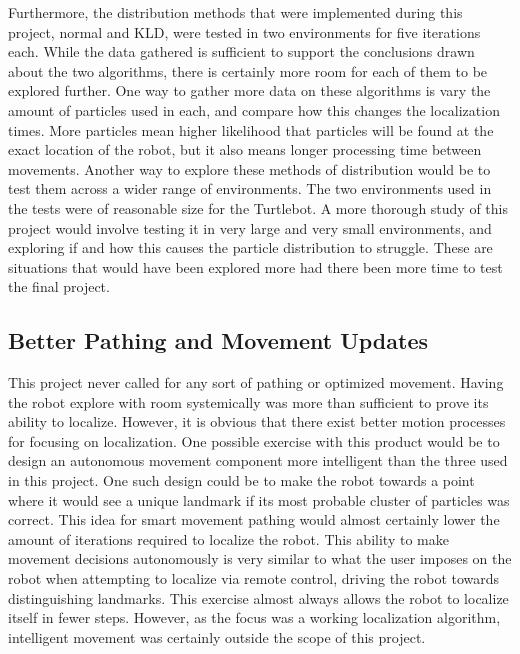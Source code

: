 \documentclass{article}
\newcommand\tab[1][0.5cm]{\hspace*{#1}}
\begin{document}
Furthermore, the distribution methods that were implemented during this project, normal and KLD, were tested in two environments for five iterations each. While the data gathered is sufficient to support the conclusions drawn about the two algorithms, there is certainly more room for each of them to be explored further. One way to gather more data on these algorithms is vary the amount of particles used in each, and compare how this changes the localization times. More particles mean higher likelihood that particles will be found at the exact location of the robot, but it also means longer processing time between movements. Another way to explore these methods of distribution would be to test them across a wider range of environments. The two environments used in the tests were of reasonable size for the Turtlebot. A more thorough study of this project would involve testing it in very large and very small environments, and exploring if and how this causes the particle distribution to struggle. These are situations that would have been explored more had there been more time to test the final project.\\

\subsection{Better Pathing and Movement Updates}\label{fig:fwpathing}
\tab This project never called for any sort of pathing or optimized movement. Having the robot explore with room systemically was more than sufficient to prove its ability to localize. However, it is obvious that there exist better motion processes for focusing on localization. One possible exercise with this product would be to design an autonomous movement component more intelligent than the three used in this project. One such design could be to make the robot towards a point where it would see a unique landmark if its most probable cluster of particles was correct. This idea for smart movement pathing would almost certainly lower the amount of iterations required to localize the robot. This ability to make movement decisions autonomously is very similar to what the user imposes on the robot when attempting to localize via remote control, driving the robot towards distinguishing landmarks. This exercise almost always allows the robot to localize itself in fewer steps. However, as the focus was a working localization algorithm, intelligent movement was certainly outside the scope of this project.\\
\end{document}
